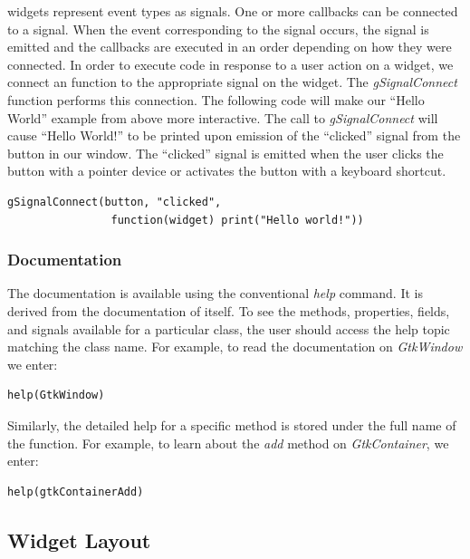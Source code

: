 \documentclass[article]{jss}
\begin{document}
 widgets represent event types as signals. One or more
callbacks can be connected to a signal. When the event corresponding to the
signal occurs, the signal is emitted and the callbacks are executed in an order
depending on how they were connected. In order to execute  code in 
response to a user action on a widget, we connect an  function to the 
appropriate signal on the widget.  The \emph{gSignalConnect} function 
performs this connection. The following code will make our ``Hello World'' 
example from above more interactive.
The call to \emph{gSignalConnect} will cause ``Hello World!'' to be printed 
upon emission of the ``clicked'' signal from the button in our window. The 
``clicked'' signal is emitted when the user clicks the button with a pointer
device or activates the button with a keyboard shortcut.
\begin{verbatim}
gSignalConnect(button, "clicked", 
                function(widget) print("Hello world!"))
\end{verbatim}

\subsubsection{Documentation}

The  documentation is available using the conventional  
\emph{help} command. It is derived from the documentation of  itself.
To see the methods, properties, fields, and signals available
for a particular class, the user should access the help topic matching the class name.
For example, to read the documentation on \emph{GtkWindow} we enter:
\begin{verbatim}
help(GtkWindow)
\end{verbatim}

Similarly, the detailed help for a specific method is stored under the full
name of the function. For example, to learn about the \emph{add} method on
\emph{GtkContainer}, we enter:
\begin{verbatim}
help(gtkContainerAdd)
\end{verbatim}

\subsection{Widget Layout}\label{sec:layout}
\end{document}
